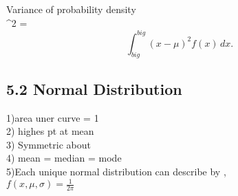 \documentclass{article}
\begin{document}
	Variance of probability density \\
	\sigma^2 =  \[ \int_{big}^{big}(x-\mu)^2f(x)\,dx.\]


\subsection{5.2 Normal Distribution}
	1)area uner curve = 1\\
	2) highes pt at mean\\
	3) Symmetric about \mu\\
	4) mean = median = mode\\
	5)Each unique normal distribution can describe by \mu, \sigma \\
	
	$f(x, \mu, \sigma) = \frac{1}{2\pi}$
\end{document}
